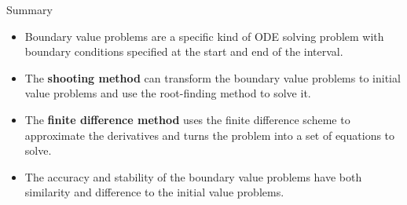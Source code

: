 \documentclass{beamer}
\begin{document}
\begin{frame}{Summary}
\begin{itemize}
    \item Boundary value problems are a specific kind of ODE solving problem with boundary conditions specified at the start and end of the interval.
    \item The \textbf{shooting method} can transform the boundary value problems to initial value problems and use the root-finding method to solve it.
    \item The \textbf{finite difference method} uses the finite difference scheme to approximate the derivatives and turns the problem into a set of equations to solve.
    \item The accuracy and stability of the boundary value problems have both similarity and difference to the initial value problems.
\end{itemize}

   
\end{frame}
\end{document}
